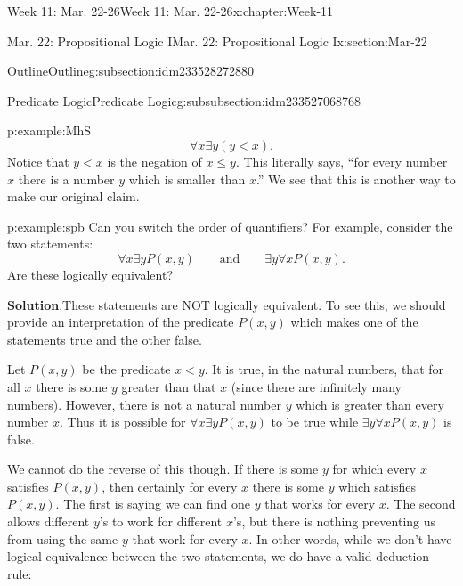 \documentclass[oneside,10pt,]{book}
\newcommand{\blocktitlefont}{\relax}
\newcommand{\tabularfont}{\relax}
\numberwithin{equation}{section}
\newcommand{\hrulethin}  {\noalign{\hrule height 0.04em}}
\renewcommand{\le}{\leqslant}
\newcommand{\lt}{<}
\begin{document}
\begin{chapterptx}{Week 11: Mar. 22-26}{}{Week 11: Mar. 22-26}{}{}{x:chapter:Week-11}
\begin{sectionptx}{Mar. 22: Propositional Logic I}{}{Mar. 22: Propositional Logic I}{}{}{x:section:Mar-22}
\begin{subsectionptx}{Outline}{}{Outline}{}{}{g:subsection:idm233528272880}
\begin{subsubsectionptx}{Predicate Logic}{}{Predicate Logic}{}{}{g:subsubsection:idm233527068768}
\begin{example}{}{p:example:MhS}
\begin{equation*}
\forall x \exists y (y \lt x)\text{.}
\end{equation*}
Notice that \(y \lt x\) is the negation of \(x \le y\). This literally says, ``for every number \(x\) there is a number \(y\) which is smaller than \(x\).'' We see that this is another way to make our original claim.%
\end{example}
\begin{example}{}{p:example:spb}%
Can you switch the order of quantifiers? For example, consider the two statements:%
\begin{equation*}
\forall x \exists y P(x,y) \qquad \mathrm{ and } \qquad \exists y \forall x P(x,y)\text{.}
\end{equation*}
Are these logically equivalent?%
\par\smallskip%
\noindent\textbf{\blocktitlefont Solution}.\hypertarget{p:solution:hPW}{}\quad{}These statements are NOT logically equivalent. To see this, we should provide an interpretation of the predicate \(P(x,y)\) which makes one of the statements true and the other false.%
\par
Let \(P(x,y)\) be the predicate \(x \lt y\). It is true, in the natural numbers, that for all \(x\) there is some \(y\) greater than that \(x\) (since there are infinitely many numbers). However, there is not a natural number \(y\) which is greater than every number \(x\). Thus it is possible for \(\forall x \exists y P(x,y)\) to be true while \(\exists y \forall x P(x,y)\) is false.%
\par
We cannot do the reverse of this though. If there is some \(y\) for which every \(x\) satisfies \(P(x,y)\), then certainly for every \(x\) there is some \(y\) which satisfies \(P(x,y)\). The first is saying we can find one \(y\) that works for every \(x\). The second allows different \(y\)'s to work for different \(x\)'s, but there is nothing preventing us from using the same \(y\) that work for every \(x\). In other words, while we don't have logical equivalence between the two statements, we do have a valid deduction rule:%
\begin{sidebyside}{1}{0}{0}{0}%
\begin{sbspanel}{1}%
\resizebox{\linewidth}{!}{%
{\centering%
{\tabularfont%
\begin{tabular}{cc}
&\(\exists y \forall x P(x,y)\)\tabularnewline\hrulethin
\(\therefore\)&\(\forall x \exists y P(x,y)\)
\end{tabular}
}%
\par}
}
\end{sbspanel}
\end{sidebyside}
\end{example}
\end{subsubsectionptx}
\end{subsectionptx}
\end{sectionptx}
\end{chapterptx}
\end{document}
